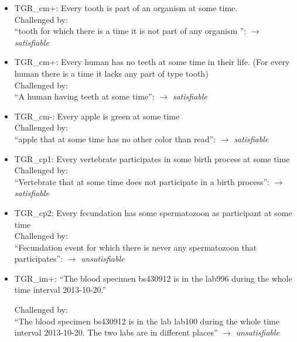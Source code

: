 
\begin{itemize}
\item TGR\_cm+: Every tooth is part of an organism at some time. \\
Challenged by: 
\\ ``tooth for which there is a time it is not part of any organism '': 
$\rightarrow$ \emph{satisfiable} \\
 
\item TGR\_cm+: Every human has no teeth at some time in their life. (For every human there is 
a time it lacks any part of type tooth)\\
Challenged by:
\\``A human having teeth at some time'':
$\rightarrow$ \emph{satisfiable} \\


\item TGR\_cm-: Every apple is green at some time
\\
Challenged by: 
\\
``apple that at some time has no other color than read'': 
$\rightarrow$ \emph{satisfiable} 


\item TGR\_cp1: Every vertebrate participates in some birth process at some time\\
Challenged by: \\  
``Vertebrate that at some time does not participate in a birth process'': 
$\rightarrow$ \emph{satisfiable} 



\item TGR\_cp2: Every fecundation has some spermatozoon as participant at some time
\\
Challenged by: \\ 
``Fecundation event for which there is never any spermatozoon that participates'': 
$\rightarrow$ \emph{unsatisfiable} \\

\item TGR\_im+: ``The blood specimen bs430912 is in the lab996 during the whole time interval 2013-10-20.'' 


Challenged by: \\ ``The blood specimen bs430912 is in the lab lab100 during the whole time interval 2013-10-20. The two labs are in different places'' 
$\rightarrow$ \emph{unsatisfiable}




\end{itemize}

